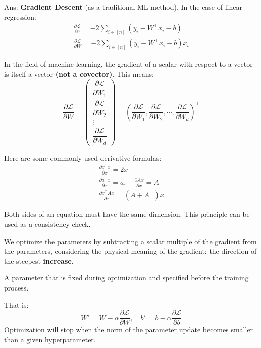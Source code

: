\documentclass[../main]{subfiles}
\begin{document}
\noindent Ans: \textbf{Gradient Descent} (as a traditional ML method). In the case of linear regression:
\begin{gather}
  \frac{\partial \mathcal L}{\partial b}=-2\sum_{i\in[n]}(y_i-W^\top x_i-b)\\
  \frac{\partial \mathcal L}{\partial W}=-2\sum_{i\in[n]}(y_i-W^\top x_i-b)x_i
\end{gather}
\begin{note}
  In the field of machine learning, the gradient of a scalar with respect to a vector is itself a vector \textbf{(not a covector)}. This means:
  \begin{equation}
    \frac{\partial \mathcal L}{\partial W}=\begin{pmatrix}
      \dfrac{\partial \mathcal L}{\partial W_1}\\
      \dfrac{\partial \mathcal L}{\partial W_2}\\
      \vdots\\
      \dfrac{\partial \mathcal L}{\partial W_d}
    \end{pmatrix}=\left(\frac{\partial \mathcal L}{\partial W_1},
    \frac{\partial \mathcal L}{\partial W_2},
    \cdots,
    \frac{\partial \mathcal L}{\partial W_d}\right)^\top
  \end{equation}
\end{note}
\begin{note}
  Here are some commonly used derivative formulas:
  \begin{gather}
    \frac{\partial x^\top x}{\partial x}=2x\\
    \frac{\partial a^\top x}{\partial x}=a,\quad \frac{\partial Ax}{\partial x}=A^\top\\
    \frac{\partial x^\top Ax}{\partial x}=(A+A^\top)x
  \end{gather}
\end{note}
\begin{remark}
  Both sides of an equation must have the same dimension. This principle can be used as a consistency check.
\end{remark}
We optimize the parameters by subtracting a scalar multiple of the gradient from the parameters, considering the physical meaning of the gradient: the direction of the steepest \textbf{increase}.
\begin{definition}[Hyperparameter]
    A parameter that is fixed during optimization and specified before the training process.
\end{definition} 
That is:
\begin{equation}
    W'=W-\alpha\frac{\partial\mathcal L}{\partial W },\quad b'=b-\alpha\frac{\partial \mathcal L}{\partial b}
\end{equation}
Optimization will stop when the norm of the parameter update becomes smaller than a given hyperparameter.
\end{document}
